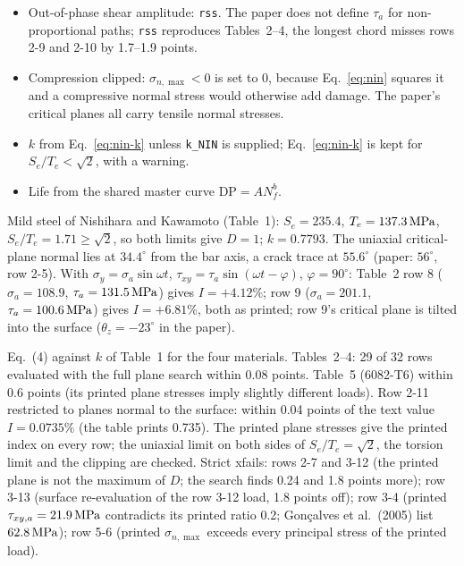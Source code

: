 \begin{itemize}
\item Out-of-phase shear amplitude: \texttt{rss}. The paper does not define $\tau_a$ for
  non-proportional paths; \texttt{rss} reproduces Tables~2--4, the longest chord misses rows 2-9 and
  2-10 by 1.7--1.9 points.
\item Compression clipped: $\sigma_{n,\max}<0$ is set to 0, because Eq.~\eqref{eq:nin} squares it and a
  compressive normal stress would otherwise add damage. The paper's critical planes all carry tensile
  normal stresses.
\item $k$ from Eq.~\eqref{eq:nin-k} unless \texttt{k\_NIN} is supplied; Eq.~\eqref{eq:nin-k} is kept
  for $S_e/T_e<\sqrt2$, with a warning.
\item Life from the shared master curve $\mathrm{DP}=AN_f^b$.
\end{itemize}

 Mild steel of Nishihara and Kawamoto (Table~1): $S_e=235.4$, $T_e=137.3\,\mathrm{MPa}$,
$S_e/T_e=1.71\ge\sqrt2$, so both limits give $D=1$; $k=0.7793$. The uniaxial critical-plane normal
lies at $34.4^\circ$ from the bar axis, a crack trace at $55.6^\circ$ (paper: $56^\circ$, row 2-5).
With $\sigma_y=\sigma_a\sin\omega t$, $\tau_{xy}=\tau_a\sin(\omega t-\varphi)$, $\varphi=90^\circ$:
Table~2 row 8 ($\sigma_a=108.9$, $\tau_a=131.5\,\mathrm{MPa}$) gives $I=+4.12\%$; row 9 ($\sigma_a=201.1$,
$\tau_a=100.6\,\mathrm{MPa}$) gives $I=+6.81\%$, both as printed; row 9's critical plane is tilted into the
surface ($\theta_z=-23^\circ$ in the paper).

 Eq.~(4) against $k$ of Table~1 for the four materials. Tables~2--4: 29 of 32 rows
evaluated with the full plane search within 0.08 points. Table~5 (6082-T6) within 0.6 points (its
printed plane stresses imply slightly different loads). Row 2-11 restricted to planes normal to the
surface: within 0.04 points of the text value $I=0.0735\%$ (the table prints 0.735). The printed plane
stresses give the printed index on every row; the uniaxial limit on both sides of
$S_e/T_e=\sqrt2$, the torsion limit and the clipping are checked. Strict xfails: rows 2-7 and 3-12
(the printed plane is not the maximum of $D$; the search finds 0.24 and 1.8 points more); row 3-13
(surface re-evaluation of the row 3-12 load, 1.8 points off); row 3-4 (printed
$\tau_{xy,a}=21.9\,\mathrm{MPa}$ contradicts its printed ratio 0.2; Gon\c{c}alves et al.\ (2005) list
$62.8\,\mathrm{MPa}$); row 5-6 (printed $\sigma_{n,\max}$ exceeds every principal stress of the printed load).
